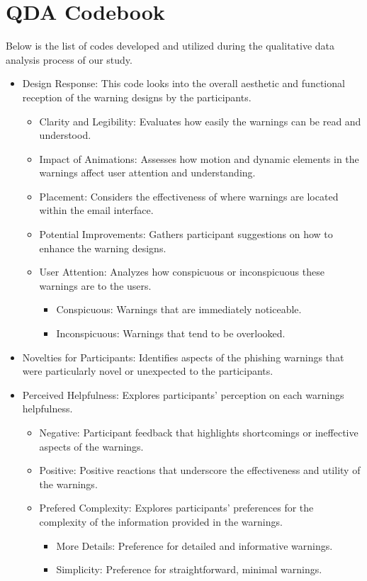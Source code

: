 \documentclass[
  a4paper,  %
  twoside,  %
  bibliography=totoc,
  headsepline,
  cleardoublepage=empty,
  parskip=half,
  draft=false
]{scrbook}
\begin{document}
\section{QDA Codebook}
\label{sec:qda}
Below is the list of codes developed and utilized during the qualitative data analysis process of our study.
\begin{itemize}
    \item Design Response: This code looks into the overall aesthetic and functional reception of the warning designs by the participants.
    \begin{itemize}
        \item Clarity and Legibility: Evaluates how easily the warnings can be read and understood.
        \item Impact of Animations: Assesses how motion and dynamic elements in the warnings affect user attention and understanding.
        \item Placement: Considers the effectiveness of where warnings are located within the email interface.
        \item Potential Improvements: Gathers participant suggestions on how to enhance the warning designs.
        \item User Attention: Analyzes how conspicuous or inconspicuous these warnings are to the users.
        \begin{itemize}
            \item Conspicuous: Warnings that are immediately noticeable.
            \item  Inconspicuous: Warnings that tend to be overlooked.
        \end{itemize}
    \end{itemize}
    \item Novelties for Participants: Identifies aspects of the phishing warnings that were particularly novel or unexpected to the participants.
    \item Perceived Helpfulness: Explores participants' perception on each warnings helpfulness.
    \begin{itemize}
        \item Negative: Participant feedback that highlights shortcomings or ineffective aspects of the warnings.
        \item Positive: Positive reactions that underscore the effectiveness and utility of the warnings.
        \item Prefered Complexity: Explores participants' preferences for the complexity of the information provided in the warnings.
        \begin{itemize}
            \item More Details: Preference for detailed and informative warnings.
            \item Simplicity: Preference for straightforward, minimal warnings.
        \end{itemize}
    \end{itemize}
\end{itemize}
\end{document}

